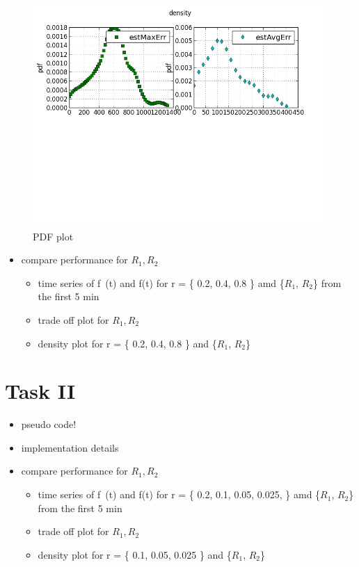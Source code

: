 \documentclass[a4paper, smallheadings,english]{scrartcl}
\begin{document}
\begin{figure}[h!]
    \begin{center}
        \includegraphics[scale=0.7]{plots/pdf_of_error}
    \end{center}
    \caption{PDF plot}
    \label{fig:pdf}
\end{figure}

\begin{itemize}
    \item compare performance for $R_1, R_2$
    \begin{itemize}
        \item time series of f~(t) and f(t) for r = \{ 0.2, 0.4, 0.8 \} amd \{$R_1$, $R_2$\} from the first 5 min
        \item trade off plot for $R_1, R_2$
        \item density plot for r = \{ 0.2, 0.4, 0.8 \} and \{$R_1$, $R_2$\}
    \end{itemize}
\end{itemize}

\section{Task II}
\begin{itemize}
    \item pseudo code!
    \item implementation details
    \item compare performance for $R_1, R_2$
    \begin{itemize}
        \item time series of f~(t) and f(t) for r = \{ 0.2, 0.1, 0.05, 0.025, \} amd \{$R_1$, $R_2$\} from the first 5 min
        \item trade off plot for $R_1, R_2$
        \item density plot for r = \{ 0.1, 0.05, 0.025 \} and \{$R_1$, $R_2$\}
    \end{itemize}
\end{itemize}
\end{document}
